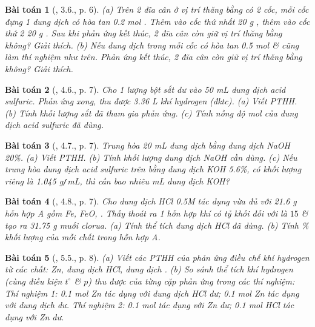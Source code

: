\documentclass{article}
\newtheorem{baitoan}{Bài toán}
\begin{document}
\begin{baitoan}[\cite{SBT_Hoa_Hoc_9}, 3.6., p. 6]
	(a) Trên 2 đĩa cân ở vị trí thăng bằng có 2 cốc, mỗi cốc đựng 1 dung dịch có hòa tan \emph{0.2 mol }. Thêm vào cốc thứ nhất \emph{20 g }, thêm vào cốc thứ 2 \emph{20 g }. Sau khi phản ứng kết thúc, 2 đĩa cân còn giữ vị trí thăng bằng không? Giải thích. (b) Nếu dung dịch trong mỗi cốc có hòa tan \emph{0.5 mol } \& cũng làm thí nghiệm như trên. Phản ứng kết thúc, 2 đĩa cân còn giữ vị trí thăng bằng không? Giải thích.
\end{baitoan}

\begin{baitoan}[\cite{SBT_Hoa_Hoc_9}, 4.6., p. 7]
	Cho 1 lượng bột sắt dư vào \emph{50 mL} dung dịch acid sulfuric. Phản ứng xong, thu được \emph{3.36 L} khí hydrogen (đktc). (a) Viết PTHH. (b) Tính khối lượng sắt đã tham gia phản ứng. (c) Tính nồng độ mol của dung dịch acid sulfuric đã dùng.
\end{baitoan}

\begin{baitoan}[\cite{SBT_Hoa_Hoc_9}, 4.7., p. 7]
	Trung hòa \emph{20 mL} dung dịch \emph{} bằng dung dịch \emph{NaOH 20\%}. (a) Viết PTHH. (b) Tính khối lượng dung dịch \emph{NaOH} cần dùng. (c) Nếu trung hòa dung dịch acid sulfuric trên bằng dung dịch \emph{KOH 5.6\%}, có khối lượng riêng là \emph{1.045 g\texttt{/}mL}, thì cần bao nhiêu \emph{mL} dung dịch \emph{KOH}?
\end{baitoan}

\begin{baitoan}[\cite{SBT_Hoa_Hoc_9}, 4.8., p. 7]
	Cho dung dịch \emph{HCl 0.5M} tác dụng vừa đủ với \emph{21.6 g} hỗn hợp A gồm \emph{Fe, FeO, }. Thấy thoát ra 1 hỗn hợp khí có tỷ khối đối với \emph{} là $15$ \& tạo ra \emph{31.75 g} muối clorua. (a) Tính thể tích dung dịch \emph{HCl} đã dùng. (b) Tính \% khối lượng của mỗi chất trong hỗn hợp A.
\end{baitoan}

\begin{baitoan}[\cite{SBT_Hoa_Hoc_9}, 5.5., p. 8]
	(a) Viết các PTHH của phản ứng điều chế khí hydrogen từ các chất: \emph{Zn}, dung dịch \emph{HCl}, dung dịch \emph{}. (b) So sánh thể tích khí hydrogen (cùng điều kiện $t^\circ$ \& $p$) thu được của từng cặp phản ứng trong các thí nghiệm: Thí nghiệm 1: \emph{0.1 mol Zn} tác dụng với dung dịch \emph{HCl} dư; \emph{0.1 mol Zn} tác dụng với dung dịch \emph{} dư.	Thí nghiệm 2: \emph{0.1 mol } tác dụng với \emph{Zn} dư; \emph{0.1 mol HCl} tác dụng với \emph{Zn} dư.
\end{baitoan}
\end{document}
